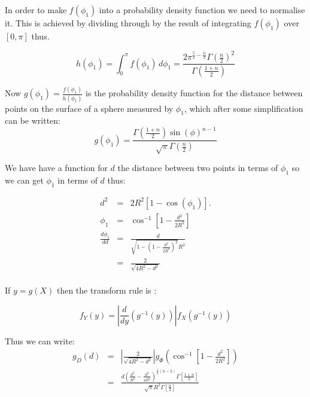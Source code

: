  In order to make  $f(\phi_1)$ into a probability density function we need to normalise it. This is achieved by dividing through by the result of integrating $f(\phi_1)$ over $[0, \pi]$ thus. 

 \begin{equation}      
 h(\phi_1) = \int_0^{\pi}  f(\phi_1) \, d\phi_1 =  \frac{2 \pi ^{\frac{5}{2}-\frac{n}{2}} \Gamma\left(\frac{n}{2}\right)^2}{\Gamma\left(\frac{1+n}{2}\right)}
\end{equation}


Now $g(\phi_1) =\frac{f(\phi_1)}{ h(\phi_1)}$ is the  probability density function for the distance between points on the surface of a sphere measured by $\phi_1$, which after some simplification can be written:
\begin{equation}  
 g(\phi_1) = \frac{\Gamma\left(\frac{1+n}{2}\right) \sin(\phi )^{n - 1}}{\sqrt{\pi } \Gamma\left(\frac{n}{2}\right)}
\end{equation} 

 
We have have a function for $d$ the distance between two points in terms of $\phi_1$ so we can get  $\phi_1$ in terms of $d$ thus:

\begin{eqnarray}
  d^2 & = & 2 R^2 \left[ 1 - \cos(\phi_1) \right].\\
\phi_1& =  & \cos^{-1} \left[1-\frac{d^2}{2 R^2}\right]\\ 
   \frac {d \phi_1}{dd} & = &\frac{d}{\sqrt{1-\left(1-\frac{d^2}{2 R^2}\right)^2} R^2} \\
   & = &\frac{2}{\sqrt{4 R^2 -d^2 }}\\
\end{eqnarray}


If $y = g(X)$ then the transform rule  is :  

\[ f_Y(y) = \left| \frac{d}{dy} \left( g^{-1}(y) \right) \right|
                f_X\left( g^{-1}(y) \right)
\]

Thus we can write:
\begin{eqnarray}
  g_D(d) & = & \left|\frac{2}{\sqrt{4 R^2 -d^2 }} \right| g_{\Phi}\left( \cos^{-1} \left[1-\frac{d^2}{2 R^2}\right]\right)\\
             & = &\frac{d \left(\frac{d^2}{R^2} -\frac{d^4}{4 R^4}\right)^{\frac{1}{2} (n-2)} \Gamma\left[\frac{1+n}{2}\right]}{\sqrt{\pi } R^2 \Gamma\left[\frac{n}{2}\right]} 
\end{eqnarray}




